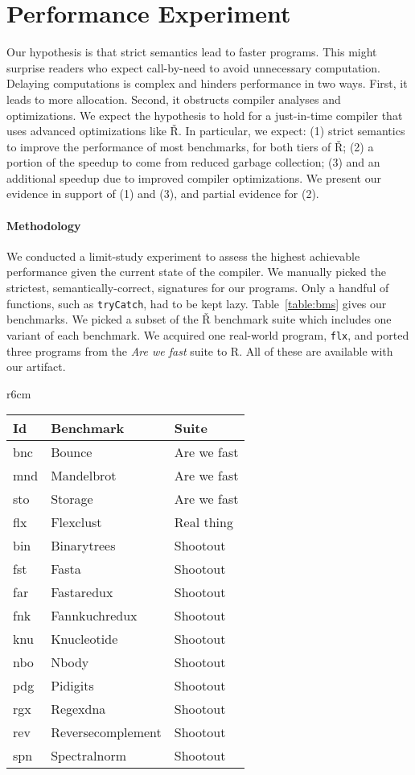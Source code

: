 \documentclass[screen,acmsmall]{acmart}
\renewcommand{\c}[1]{\lstinline |#1|\xspace}
\renewcommand{\Rsh}{{\sf\v R}\xspace}
\begin{document}
\section{Performance Experiment}\label{sec:rsh}

Our hypothesis is that strict semantics lead to faster programs. This might
surprise readers who expect call-by-need to avoid unnecessary computation.
Delaying computations is complex and hinders performance in two ways. First, it
leads to more allocation. Second, it obstructs compiler analyses and
optimizations. We expect the hypothesis to hold for a just-in-time compiler that
uses advanced optimizations like \Rsh. In particular, we expect: (1) strict
semantics to improve the performance of most benchmarks, for both tiers of \Rsh; (2)
a portion of the speedup to come from reduced garbage collection; (3) and an
additional speedup due to improved compiler optimizations. We present our
evidence in support of (1) and (3), and partial evidence for (2).

\paragraph{Methodology}
We conducted a limit-study experiment to assess the highest achievable
performance given the current state of the compiler. We manually picked the
strictest, semantically-correct, signatures for our programs. Only a handful of
functions, such as \lstinline{tryCatch}, had to be kept lazy.
Table~\ref{table:bms} gives our benchmarks. We picked a subset of the \Rsh
benchmark suite which includes one variant of each benchmark. We acquired one
real-world program, \c{flx}, and ported three programs from the \emph{Are we
fast} suite to R. All of these are available with our artifact.

\begin{wrapfigure}{r}{6cm}
  \small
  \caption{Benchmarks}\label{table:bms}
  \begin{tabular}{lll}
    \toprule
    \bf Id&\bf Benchmark&\bf Suite\\
    \midrule
    bnc&Bounce&Are we fast\\
    mnd&Mandelbrot&Are we fast\\
    sto&Storage&Are we fast\\
    flx&Flexclust&Real thing\\
    bin&Binarytrees&Shootout\\
    fst&Fasta&Shootout\\
    far&Fastaredux&Shootout\\
    fnk&Fannkuchredux&Shootout\\
    knu&Knucleotide&Shootout\\
    nbo&Nbody&Shootout\\
    pdg&Pidigits&Shootout\\
    rgx&Regexdna&Shootout\\
    rev&Reversecomplement&Shootout\\
    spn&Spectralnorm&Shootout\\
    \bottomrule
  \end{tabular}
\end{wrapfigure}
\end{document}
